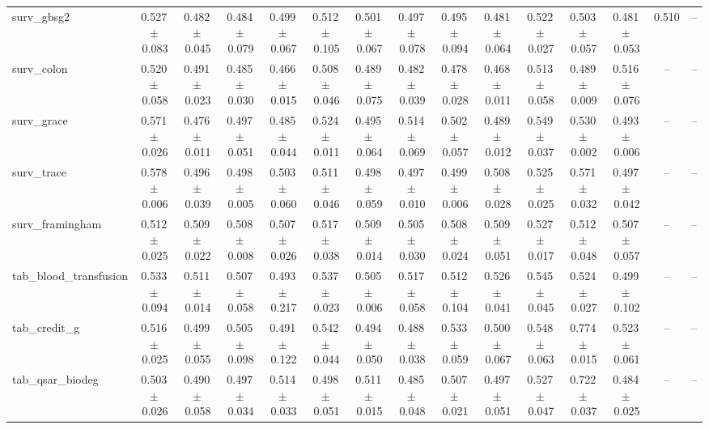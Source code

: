 \documentclass[8pt]{extarticle}
\begin{document}
\begin{longtable}{l*{14}{c}}
surv\_gbsg2 & 0.527\,$\pm$\,0.083 & 0.482\,$\pm$\,0.045 & 0.484\,$\pm$\,0.079 & 0.499\,$\pm$\,0.067 & 0.512\,$\pm$\,0.105 & 0.501\,$\pm$\,0.067 & 0.497\,$\pm$\,0.078 & 0.495\,$\pm$\,0.094 & 0.481\,$\pm$\,0.064 & 0.522\,$\pm$\,0.027 & 0.503\,$\pm$\,0.057 & 0.481\,$\pm$\,0.053 & 0.510 & -- \\
surv\_colon & 0.520\,$\pm$\,0.058 & 0.491\,$\pm$\,0.023 & 0.485\,$\pm$\,0.030 & 0.466\,$\pm$\,0.015 & 0.508\,$\pm$\,0.046 & 0.489\,$\pm$\,0.075 & 0.482\,$\pm$\,0.039 & 0.478\,$\pm$\,0.028 & 0.468\,$\pm$\,0.011 & 0.513\,$\pm$\,0.058 & 0.489\,$\pm$\,0.009 & 0.516\,$\pm$\,0.076 & -- & -- \\
surv\_grace & 0.571\,$\pm$\,0.026 & 0.476\,$\pm$\,0.011 & 0.497\,$\pm$\,0.051 & 0.485\,$\pm$\,0.044 & 0.524\,$\pm$\,0.011 & 0.495\,$\pm$\,0.064 & 0.514\,$\pm$\,0.069 & 0.502\,$\pm$\,0.057 & 0.489\,$\pm$\,0.012 & 0.549\,$\pm$\,0.037 & 0.530\,$\pm$\,0.002 & 0.493\,$\pm$\,0.006 & -- & -- \\
surv\_trace & 0.578\,$\pm$\,0.006 & 0.496\,$\pm$\,0.039 & 0.498\,$\pm$\,0.005 & 0.503\,$\pm$\,0.060 & 0.511\,$\pm$\,0.046 & 0.498\,$\pm$\,0.059 & 0.497\,$\pm$\,0.010 & 0.499\,$\pm$\,0.006 & 0.508\,$\pm$\,0.028 & 0.525\,$\pm$\,0.025 & 0.571\,$\pm$\,0.032 & 0.497\,$\pm$\,0.042 & -- & -- \\
surv\_framingham & 0.512\,$\pm$\,0.025 & 0.509\,$\pm$\,0.022 & 0.508\,$\pm$\,0.008 & 0.507\,$\pm$\,0.026 & 0.517\,$\pm$\,0.038 & 0.509\,$\pm$\,0.014 & 0.505\,$\pm$\,0.030 & 0.508\,$\pm$\,0.024 & 0.509\,$\pm$\,0.051 & 0.527\,$\pm$\,0.017 & 0.512\,$\pm$\,0.048 & 0.507\,$\pm$\,0.057 & -- & -- \\
tab\_blood\_transfusion & 0.533\,$\pm$\,0.094 & 0.511\,$\pm$\,0.014 & 0.507\,$\pm$\,0.058 & 0.493\,$\pm$\,0.217 & 0.537\,$\pm$\,0.023 & 0.505\,$\pm$\,0.006 & 0.517\,$\pm$\,0.058 & 0.512\,$\pm$\,0.104 & 0.526\,$\pm$\,0.041 & 0.545\,$\pm$\,0.045 & 0.524\,$\pm$\,0.027 & 0.499\,$\pm$\,0.102 & -- & -- \\
tab\_credit\_g & 0.516\,$\pm$\,0.025 & 0.499\,$\pm$\,0.055 & 0.505\,$\pm$\,0.098 & 0.491\,$\pm$\,0.122 & 0.542\,$\pm$\,0.044 & 0.494\,$\pm$\,0.050 & 0.488\,$\pm$\,0.038 & 0.533\,$\pm$\,0.059 & 0.500\,$\pm$\,0.067 & 0.548\,$\pm$\,0.063 & 0.774\,$\pm$\,0.015 & 0.523\,$\pm$\,0.061 & -- & -- \\
tab\_qsar\_biodeg & 0.503\,$\pm$\,0.026 & 0.490\,$\pm$\,0.058 & 0.497\,$\pm$\,0.034 & 0.514\,$\pm$\,0.033 & 0.498\,$\pm$\,0.051 & 0.511\,$\pm$\,0.015 & 0.485\,$\pm$\,0.048 & 0.507\,$\pm$\,0.021 & 0.497\,$\pm$\,0.051 & 0.527\,$\pm$\,0.047 & 0.722\,$\pm$\,0.037 & 0.484\,$\pm$\,0.025 & -- & -- \\

\end{longtable}
\end{document}
